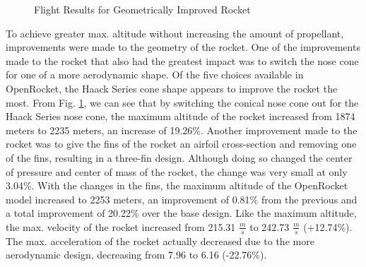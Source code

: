 \documentclass{report}
\begin{document}
\begin{figure}[h!]
    \centering
    \caption{Flight Results for Geometrically Improved Rocket}
    \label{fig:geoImprov}
\end{figure}

\noindent To achieve greater max. altitude without increasing the amount of propellant, improvements were made to the geometry of the rocket.
One of the improvements made to the rocket that also had the greatest impact was to switch the nose cone for one of a more aerodynamic shape.
Of the five choices available in OpenRocket, the Haack Series cone shape appears to improve the rocket the most.
From Fig. \ref{fig:geoImprov}, we can see that by switching the conical nose cone out for the Haack Series nose cone, the maximum altitude of the rocket increased from 1874 meters to 2235 meters, an increase of 19.26\%.
Another improvement made to the rocket was to give the fins of the rocket an airfoil cross-section and removing one of the fins, resulting in a three-fin design.
Although doing so changed the center of pressure and center of mass of the rocket, the change was very small at only 3.04\%.
With the changes in the fins, the maximum altitude of the OpenRocket model increased to 2253 meters, an improvement of 0.81\% from the previous and a total improvement of 20.22\% over the base design.
Like the maximum altitude, the max. velocity of the rocket increased from 215.31 $\frac{m}{s}$ to 242.73 $\frac{m}{s}$ (+12.74\%).
The max. acceleration of the rocket actually decreased due to the more aerodynamic design, decreasing from 7.96 to 6.16 (-22.76\%).\\
\end{document}
